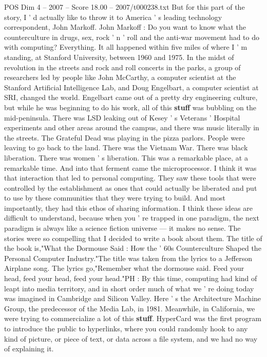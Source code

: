 \begin{textsample}{POS Dim 4 – 2007 – Score 18.00 – 2007/t000238.txt}
But for this part of the story, I ' d actually like to throw it to America ' s leading technology correspondent, John Markoff.
John Markoff : Do you want to know what the counterculture in drugs, sex, rock ' n ' roll and the anti-war movement had to do with computing?
Everything.
It all happened within five miles of where I ' m standing, at Stanford University, between 1960 and 1975.
In the midst of revolution in the streets and rock and roll concerts in the parks, a group of researchers led by people like John McCarthy, a computer scientist at the Stanford Artificial Intelligence Lab, and Doug Engelbart, a computer scientist at SRI, changed the world.
Engelbart came out of a pretty dry engineering culture, but while he was beginning to do his work, all of this \textbf{stuff} was bubbling on the mid-peninsula.
There was LSD leaking out of Kesey ' s Veterans ' Hospital experiments and other areas around the campus, and there was music literally in the streets.
The Grateful Dead was playing in the pizza parlors.
People were leaving to go back to the land.
There was the Vietnam War.
There was black liberation.
There was women ' s liberation.
This was a remarkable place, at a remarkable time.
And into that ferment came the microprocessor.
I think it was that interaction that led to personal computing.
They saw these tools that were controlled by the establishment as ones that could actually be liberated and put to use by these communities that they were trying to build.
And most importantly, they had this ethos of sharing information.
I think these ideas are difficult to understand, because when you ' re trapped in one paradigm, the next paradigm is always like a science fiction universe — it makes no sense.
The stories were so compelling that I decided to write a book about them.
The title of the book is,"What the Dormouse Said : How the ' 60s Counterculture Shaped the Personal Computer Industry."The title was taken from the lyrics to a Jefferson Airplane song.
The lyrics go,"Remember what the dormouse said.
Feed your head, feed your head, feed your head."PH : By this time, computing had kind of leapt into media territory, and in short order much of what we ' re doing today was imagined in Cambridge and Silicon Valley.
Here ' s the Architecture Machine Group, the predecessor of the Media Lab, in 1981.
Meanwhile, in California, we were trying to commercialize a lot of this \textbf{stuff}.
HyperCard was the first program to introduce the public to hyperlinks, where you could randomly hook to any kind of picture, or piece of text, or data across a file system, and we had no way of explaining it.

\end{textsample}
